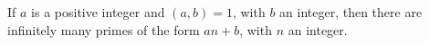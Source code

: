\documentclass{article}
\begin{document}
If $a$ is a positive integer and $(a,b)=1$, with $b$ an integer, then there are infinitely many primes of the form $an + b$, with $n$ an integer.
\end{document}
